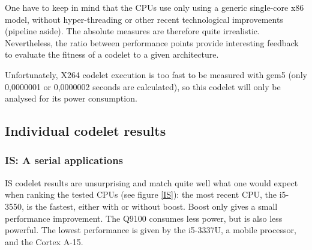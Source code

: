 \documentclass{article}
\begin{document}
\begin{multicols}{2}
One have to keep in mind that the CPUs use only using a generic single-core x86 model, without hyper-threading or other recent technological improvements (pipeline aside). The absolute measures are therefore quite irrealistic. Nevertheless, the ratio between performance points provide interesting feedback to evaluate the fitness of a codelet to a given architecture.

\newpage %
Unfortunately, X264 codelet execution is too fast to be measured with gem5 (only 0,0000001 or 0,0000002 seconds are calculated), so this codelet will only be analysed for its power consumption. 




\subsection{Individual codelet results}

\subsubsection{IS: A serial applications}
IS codelet results are unsurprising and match quite well what one would expect when ranking the tested CPUs (see figure \ref{IS}): the most recent CPU, the i5-3550, is the fastest, either with or without boost. Boost only gives a small performance improvement. The Q9100 consumes less power, but is also less powerful. The lowest performance is given by the i5-3337U, a mobile processor, and the Cortex A-15.


\end{multicols}
\end{document}
